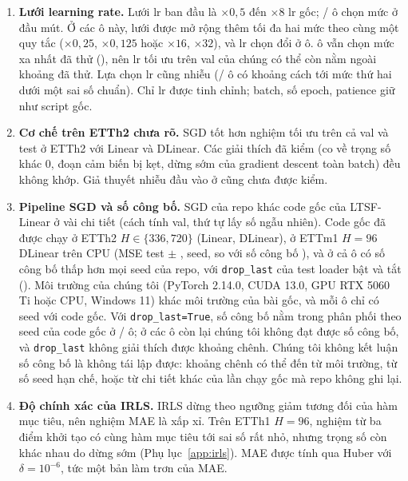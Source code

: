 \begin{enumerate}[label=\arabic*., ref=\arabic*]
    \item \label{lim:lr}\textbf{Lưới learning rate.} Lưới lr ban đầu là $\times 0{,}5$ đến $\times 8$ lr gốc; \nmTunedLrEdgeOldCount/\nmTunedLrCellCount{} ô chọn mức ở đầu mút. Ở các ô này, lưới được mở rộng thêm tối đa hai mức theo cùng một quy tắc ($\times 0{,}25$, $\times 0{,}125$ hoặc $\times 16$, $\times 32$), và lr chọn đổi ở \nmTunedLrExtChangedCount{} ô. \nmTunedLrEdgeCount{} ô vẫn chọn mức xa nhất đã thử (\nmTunedLrStillEdgeList), nên lr tối ưu trên val của chúng có thể còn nằm ngoài khoảng đã thử. Lựa chọn lr cũng nhiễu (\nmTunedLrNoisyCount/\nmTunedLrCellCount{} ô có khoảng cách tới mức thứ hai dưới một sai số chuẩn). Chỉ lr được tinh chỉnh; batch, số epoch, patience giữ như script gốc.
    \item \label{lim:etth2}\textbf{Cơ chế trên ETTh2 chưa rõ.} SGD tốt hơn nghiệm tối ưu trên cả val và test ở ETTh2 với Linear và DLinear. Các giải thích đã kiểm (co về trọng số khác $0$, đoạn cảm biến bị kẹt, dừng sớm của gradient descent toàn batch) đều không khớp. Giả thuyết nhiễu đầu vào ở  cũng chưa được kiểm.
    \item \label{lim:pipeline}\textbf{Pipeline SGD và số công bố.} SGD của repo khác code gốc của LTSF-Linear ở vài chi tiết (cách tính val, thứ tự lấy số ngẫu nhiên). Code gốc đã được chạy ở ETTh2 $H \in \{336, 720\}$ (Linear, DLinear), ở ETTm1 $H = 96$ DLinear trên CPU (MSE test \nmOffETTmOneHNineSixMean{} $\pm$ \nmOffETTmOneHNineSixSd, \nmOffETTmOneHNineSixN{} seed, so với số công bố \nmBOneETTmOneHNineSixDLinearPub), và ở cả \nmDropCellCount{} ô có số công bố thấp hơn mọi seed của repo, với \texttt{drop\_last} của test loader bật và tắt (). Môi trường của chúng tôi (PyTorch 2.14.0, CUDA 13.0, GPU RTX 5060 Ti hoặc CPU, Windows 11) khác môi trường của bài gốc, và mỗi ô chỉ có \nmDropSeedCount{} seed với code gốc. Với \texttt{drop\_last=True}, số công bố nằm trong phân phối theo seed của code gốc ở \nmDropPubInTrueCount/\nmDropCellCount{} ô; ở các ô còn lại chúng tôi không đạt được số công bố, và \texttt{drop\_last} không giải thích được khoảng chênh. Chúng tôi không kết luận số công bố là không tái lập được: khoảng chênh có thể đến từ môi trường, từ số seed hạn chế, hoặc từ chi tiết khác của lần chạy gốc mà repo không ghi lại.
    \item \label{lim:irls}\textbf{Độ chính xác của IRLS.} IRLS dừng theo ngưỡng giảm tương đối của hàm mục tiêu, nên nghiệm MAE là xấp xỉ. Trên ETTh1 $H = 96$, nghiệm từ ba điểm khởi tạo có cùng hàm mục tiêu tới sai số rất nhỏ, nhưng trọng số còn khác nhau do dừng sớm (Phụ lục~\ref{app:irls}). MAE được tính qua Huber với $\delta = 10^{-6}$, tức một bản làm trơn của MAE.

\end{enumerate}
